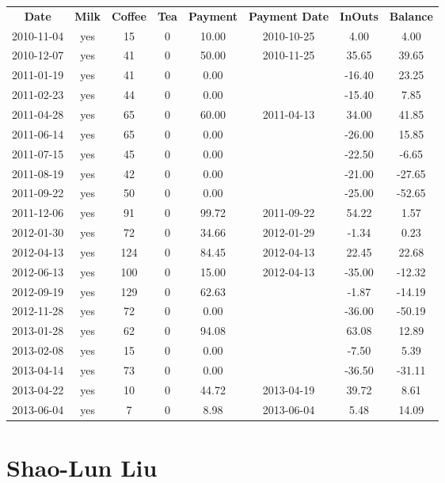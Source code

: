 \begin{center}
\begin{tabular}{cccccccc}
\textbf{Date} & \textbf{Milk} & \textbf{Coffee} & \textbf{Tea} & \textbf{Payment} & \textbf{Payment Date} & \textbf{InOuts} & \textbf{Balance} \\
2010-11-04 & yes &  15 & 0 &  10.00 & 2010-10-25 &   4.00 &   4.00\\ 
2010-12-07 & yes &  41 & 0 &  50.00 & 2010-11-25 &  35.65 &  39.65\\ 
2011-01-19 & yes &  41 & 0 &   0.00 &  & -16.40 &  23.25\\ 
2011-02-23 & yes &  44 & 0 &   0.00 &  & -15.40 &   7.85\\ 
2011-04-28 & yes &  65 & 0 &  60.00 & 2011-04-13 &  34.00 &  41.85\\ 
2011-06-14 & yes &  65 & 0 &   0.00 &  & -26.00 &  15.85\\ 
2011-07-15 & yes &  45 & 0 &   0.00 &  & -22.50 &  -6.65\\ 
2011-08-19 & yes &  42 & 0 &   0.00 &  & -21.00 & -27.65\\ 
2011-09-22 & yes &  50 & 0 &   0.00 &  & -25.00 & -52.65\\ 
2011-12-06 & yes &  91 & 0 &  99.72 & 2011-09-22 &  54.22 &   1.57\\ 
2012-01-30 & yes &  72 & 0 &  34.66 & 2012-01-29 &  -1.34 &   0.23\\ 
2012-04-13 & yes & 124 & 0 &  84.45 & 2012-04-13 &  22.45 &  22.68\\ 
2012-06-13 & yes & 100 & 0 &  15.00 & 2012-04-13 & -35.00 & -12.32\\ 
2012-09-19 & yes & 129 & 0 &  62.63 &  &  -1.87 & -14.19\\ 
2012-11-28 & yes &  72 & 0 &   0.00 &  & -36.00 & -50.19\\ 
2013-01-28 & yes &  62 & 0 &  94.08 &  &  63.08 &  12.89\\ 
2013-02-08 & yes &  15 & 0 &   0.00 &  &  -7.50 &   5.39\\ 
2013-04-14 & yes &  73 & 0 &   0.00 &  & -36.50 & -31.11\\ 
2013-04-22 & yes &  10 & 0 &  44.72 & 2013-04-19 &  39.72 &   8.61\\ 
2013-06-04 & yes &   7 & 0 &   8.98 & 2013-06-04 &   5.48 &  14.09
\end{tabular}
\end{center}

\section{Shao-Lun Liu}

